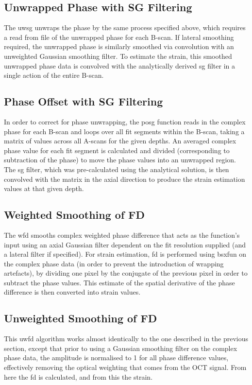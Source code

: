 \subsection{Unwrapped Phase with SG Filtering}
The \ac{uwsg} unwraps the phase by the same process specified above, which requires a read from file of the unwrapped phase for each B-scan. If lateral smoothing required, the unwrapped phase is similarly smoothed via convolution with an unweighted Gaussian smoothing filter. To estimate the strain, this smoothed unwrapped phase data is convolved with the analytically derived \ac{sg} filter in a single action of the entire B-scan.
   
\subsection{Phase Offset with SG Filtering}
In order to correct for phase unwrapping, the \ac{posg} function reads in the complex phase for each B-scan and loops over all fit segments within the B-scan, taking a matrix of values across all A-scans for the given depths. An averaged complex phase value for each fit segment is calculated and divided (corresponding to subtraction of the phase) to move the phase values into an unwrapped region. The \ac{sg} filter, which was pre-calculated using the analytical solution, is then convolved with the matrix in the axial direction to produce the strain estimation values at that given depth. 

\subsection{Weighted Smoothing of FD}
The \ac{wfd} smooths complex weighted phase difference that acts as the function's input using an axial Gaussian filter dependent on the fit resolution supplied (and a lateral filter if specified). For strain estimation, \ac{fd} is performed using bsxfun on the complex phase data (in order to prevent the introduction of  wrapping artefacts), by dividing one pixel by the conjugate of the previous pixel in order to subtract the phase values. This estimate of the spatial derivative of the phase difference is then converted into strain values.

\subsection{Unweighted Smoothing of FD}
This \ac{uwfd} algorithm works almost identically to the one described in the previous section, except that prior to using a Gaussian smoothing filter on the complex phase data, the amplitude is normalised to 1 for all phase difference values, effectively removing the optical weighting that comes from the OCT signal. From here the \ac{fd} is calculated, and from this the strain. 

